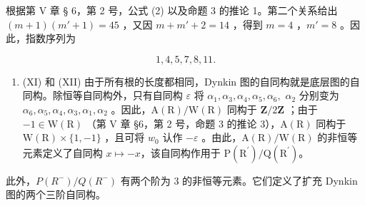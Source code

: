根据第 V 章 § 6，第 2 号，公式 (2) 以及命题 3 的推论 1。第二个关系给出 \((m + 1)(m' + 1) = 45\) ，又因 \(m + m' + 2 = 14\) ，得到 \(m = 4\) ，\(m' = 8\) 。因此，指数序列为

\[
1, 4, 5, 7, 8, 11.
\]

\begin{enumerate}
\def\labelenumi{(\Roman{enumi})}
\setcounter{enumi}{10}
\tightlist
\item
  (XI) 和 (XII) 由于所有根的长度都相同，Dynkin 图的自同构就是底层图的自同构。除恒等自同构外，只有自同构 \(\varepsilon\) 将 \(\alpha_{1},\alpha_{3},\alpha_{4},\alpha_{5},\alpha_{6},\) \(\alpha_{2}\) 分别变为 \(\alpha_{6},\alpha_{5},\alpha_{4},\alpha_{3},\alpha_{1},\alpha_{2}\) 。因此，\(\mathrm{A(R) / W(R)}\) 同构于 \(\mathbf{Z} / 2\mathbf{Z}\) ；由于 \(-1\in \mathrm{W(R)}\) （第 V 章 §6，第 2 号，命题 3 的推论 3），\(\mathrm{A(R)}\) 同构于 \(\mathrm{W(R)}\times \{1, - 1\}\) ，且可将 \(w_0\) 认作 \(-\varepsilon\) 。由此，\(\mathrm{A(R) / W(R)}\) 的非恒等元素定义了自同构 \(x\mapsto -x\)，该自同构作用于 \(\mathrm{P(R^{\prime}) / Q(R^{\prime})}\)。
\end{enumerate}

此外，\(P(R^{-})/Q(R^{-})\) 有两个阶为 3 的非恒等元素。它们定义了扩充 Dynkin 图的两个三阶自同构。

